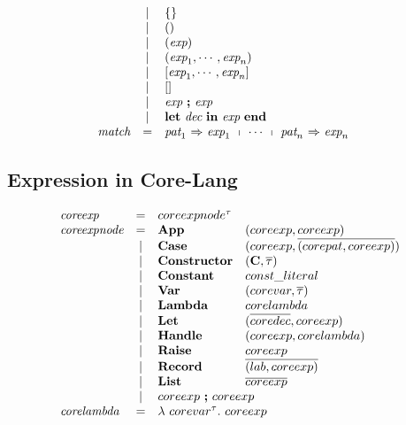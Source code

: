 \documentclass[11pt,a4paper]{article}
\newcommand{\key}[1]{\textrm{\textbf{#1}}}
\newcommand{\prodlhs}[1]{\textit{#1}}
\newcommand{\braced}[1]{\{#1\}}
\newcommand{\lam}  {\mathbf\lambda}
\newcommand{\vcon} {\mathbf{C}}
\newcommand{\vect}[1]{\overline{#1}}
\begin{document}
{\[\begin{array}{lcll}
    & | & \braced{}                                                                 &\\
    & | & ()                                                                        &\\
    & | & (\prodlhs{exp})                                                           &\\
    & | & (\prodlhs{exp}_1, \cdots, \prodlhs{exp}_n)                                &\\
    & | & [\prodlhs{exp}_1, \cdots, \prodlhs{exp}_n]                                &\\
    & | & []                                                                        &\\
    & | & \prodlhs{exp}\ \key{;}\ \prodlhs{exp}                                     &\\
    & | & \key{let}\ \prodlhs{dec}\ \key{in}\ \prodlhs{exp}\ \key{end}              &\\
\prodlhs{match}
    & = & \prodlhs{pat}_1\ \key{$\Rightarrow$}\ \prodlhs{exp}_1\ \shortmid\ \cdots\ \shortmid\ \prodlhs{pat}_n\ \key{$\Rightarrow$}\ \prodlhs{exp}_n & \\
\end{array}
\]}

\subsection {Expression in Core-Lang}
{\renewcommand{\arraystretch}{1.2}\[
\begin{array}{lcll}
\prodlhs{coreexp}
	& = & \multicolumn{2}{l}{coreexpnode^\tau}				    \\
\prodlhs{coreexpnode}
    & = & \key{App}  & (coreexp, coreexp)						\\
    & | & \key{Case} & (coreexp, \vect{(corepat,coreexp)})   	\\
    & | & \key{Constructor} & (\vcon, \vect\tau)				\\
    & | & \key{Constant}	& const\_literal        			\\
    & | & \key{Var}  		& (corevar, \vect\tau)     		    \\ 
    & | & \key{Lambda}  	& corelambda						\\ 
    & | & \key{Let}			& (\vect{coredec}, coreexp)			\\
    & | & \key{Handle}		& (coreexp, corelambda)             \\
    & | & \key{Raise}		& coreexp							\\
    & | & \key{Record}		& \vect{(lab, coreexp)} 		    \\		 
    & | & \key{List}		& \vect{coreexp}					\\
    & | & \multicolumn{2}{l}{coreexp\ \key{;}\ coreexp}			\\
\prodlhs{corelambda}
	& = & \multicolumn{2}{l}{\lam\ corevar^\tau.\ coreexp}      \\
\end{array}
\]}
\end{document}

